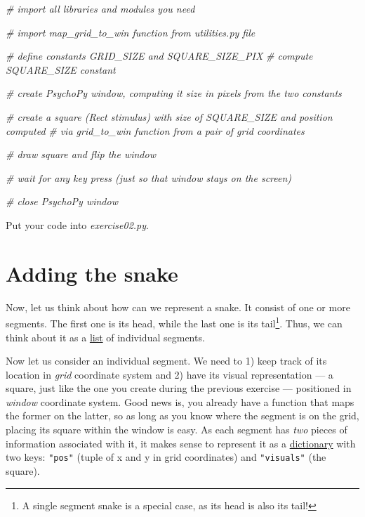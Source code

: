 \documentclass[
]{book}
\newenvironment{Shaded}{\begin{snugshade}}{\end{snugshade}}
\newcommand{\CommentTok}[1]{\textcolor[rgb]{0.56,0.35,0.01}{\textit{#1}}}
\begin{document}
\begin{Shaded}
\begin{Highlighting}[]
\CommentTok{\# import all libraries and modules you need}

\CommentTok{\# import map\_grid\_to\_win function from utilities.py file}

\CommentTok{\# define constants GRID\_SIZE and SQUARE\_SIZE\_PIX}
\CommentTok{\# compute SQUARE\_SIZE constant}

\CommentTok{\# create PsychoPy window, computing it size in pixels from the two constants}

\CommentTok{\# create a square (Rect stimulus) with size of SQUARE\_SIZE and position computed}
\CommentTok{\#   via grid\_to\_win function from a pair of grid coordinates}

\CommentTok{\# draw square and flip the window}

\CommentTok{\# wait for any key press (just so that window stays on the screen)}

\CommentTok{\# close PsychoPy window}
\end{Highlighting}
\end{Shaded}

Put your code into \emph{exercise02.py}.

\hypertarget{adding-the-snake}{%
\section{Adding the snake}\label{adding-the-snake}}

Now, let us think about how can we represent a snake. It consist of one or more segments. The first one is its head, while the last one is its tail\footnote{A single segment snake is a special case, as its head is also its tail!}. Thus, we can think about it as a \href{https://docs.python.org/3/tutorial/datastructures.html\#more-on-lists}{list} of individual segments.

Now let us consider an individual segment. We need to 1) keep track of its location in \emph{grid} coordinate system and 2) have its visual representation --- a square, just like the one you create during the previous exercise --- positioned in \emph{window} coordinate system. Good news is, you already have a function that maps the former on the latter, so as long as you know where the segment is on the grid, placing its square within the window is easy. As each segment has \emph{two} pieces of information associated with it, it makes sense to represent it as a \href{https://docs.python.org/3/tutorial/datastructures.html\#dictionaries}{dictionary} with two keys: \texttt{"pos"} (tuple of x and y in grid coordinates) and \texttt{"visuals"} (the square).
\end{document}
